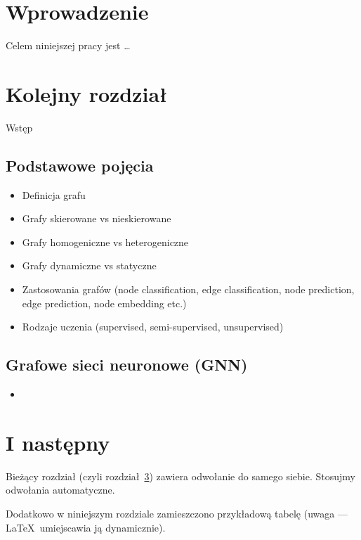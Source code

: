\documentclass[12pt,a4paper,twoside,openany]{book}
\begin{document}
\chapter{Wprowadzenie}

Celem niniejszej pracy jest \ldots

\chapter{Kolejny rozdział}
Wstęp
\section{Podstawowe pojęcia}
\begin{itemize}
\item Definicja grafu \cite{gnn.review}
\item Grafy skierowane vs nieskierowane
\item Grafy homogeniczne vs heterogeniczne
\item Grafy dynamiczne vs statyczne
\item Zastosowania grafów (node classification, edge classification, node 
prediction, edge prediction, node embedding etc.)
\item Rodzaje uczenia (supervised, semi-supervised, unsupervised)

\end{itemize}

\section{Grafowe sieci neuronowe (GNN)}
\begin{itemize}
    \item 
\end{itemize}




\chapter{I następny}
\label{sec:nast}

Bieżący rozdział (czyli rozdział~\ref{sec:nast}) zawiera odwołanie do samego siebie. Stosujmy odwołania automatyczne.

Dodatkowo w niniejszym rozdziale zamieszczono przykładową tabelę (uwaga --- \LaTeX\ umiejscawia ją dynamicznie).

\end{document}
